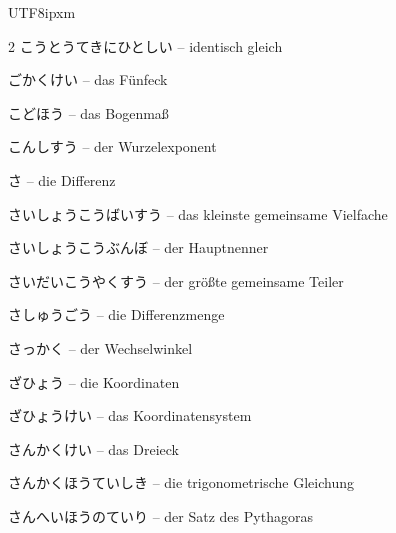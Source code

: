 \begin{CJK}{UTF8}{ipxm}
\begin{multicols}{2}
 {\footnotesize\color{black!70}こうとうてきにひとしい} -- identisch gleich\dotfill\hyperref[e:62]{\pageref*{e:62}}\par
{} {\footnotesize\color{black!70}ごかくけい} -- das Fünfeck\dotfill\hyperref[e:206]{\pageref*{e:206}}\par
{} {\footnotesize\color{black!70}こどほう} -- das Bogenmaß\dotfill\hyperref[e:139]{\pageref*{e:139}}\par
{} {\footnotesize\color{black!70}こんしすう} -- der Wurzelexponent\dotfill\hyperref[e:49]{\pageref*{e:49}}\par

\par\nopagebreak
{} {\footnotesize\color{black!70}さ} -- die Differenz\dotfill\hyperref[e:18]{\pageref*{e:18}}\par
{} {\footnotesize\color{black!70}さいしょうこうばいすう} -- das kleinste gemeinsame Vielfache\dotfill\hyperref[e:57]{\pageref*{e:57}}\par
{} {\footnotesize\color{black!70}さいしょうこうぶんぼ} -- der Hauptnenner\dotfill\hyperref[e:36]{\pageref*{e:36}}\par
{} {\footnotesize\color{black!70}さいだいこうやくすう} -- der größte gemeinsame Teiler\dotfill\hyperref[e:56]{\pageref*{e:56}}\par
{} {\footnotesize\color{black!70}さしゅうごう} -- die Differenzmenge\dotfill\hyperref[e:102]{\pageref*{e:102}}\par
{} {\footnotesize\color{black!70}さっかく} -- der Wechselwinkel\dotfill\hyperref[e:168]{\pageref*{e:168}}\par
{} {\footnotesize\color{black!70}ざひょう} -- die Koordinaten\dotfill\hyperref[e:116]{\pageref*{e:116}}\par
{} {\footnotesize\color{black!70}ざひょうけい} -- das Koordinatensystem\dotfill\hyperref[e:113]{\pageref*{e:113}}\par
{} {\footnotesize\color{black!70}さんかくけい} -- das Dreieck\dotfill\hyperref[e:177]{\pageref*{e:177}}\par
{} {\footnotesize\color{black!70}さんかくほうていしき} -- die trigonometrische Gleichung\dotfill\hyperref[e:86]{\pageref*{e:86}}\par
{} {\footnotesize\color{black!70}さんへいほうのていり} -- der Satz des Pythagoras\dotfill\hyperref[e:190]{\pageref*{e:190}}\par

\end{multicols}
\end{CJK}
